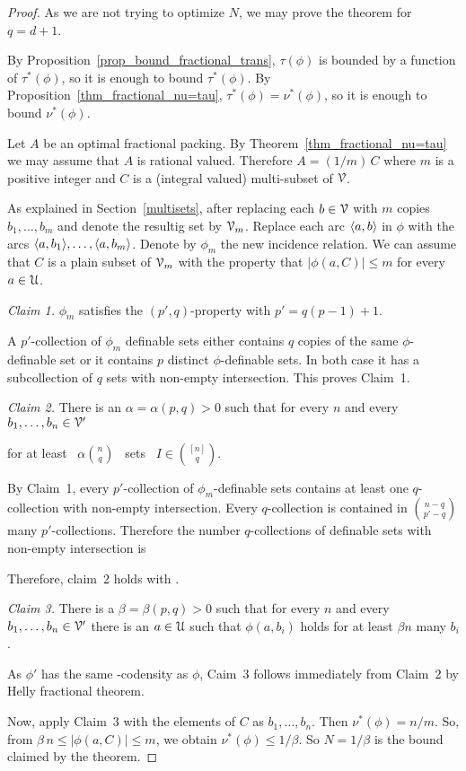 \documentclass[sputnik.tex]{subfiles}
\begin{document}
\begin{proof}
As we are not trying to optimize $N$, we may prove the theorem for $q=d+1$.

By Proposition~\ref{prop_bound_fractional_trans}, $\tau(\phi)$ is bounded by a function of $\tau^*(\phi)$, so it is enough to bound $\tau^*(\phi)$. By Proposition~\ref{thm_fractional_nu=tau},  $\tau^*(\phi)=\nu^*(\phi)$, so it is enough to bound $\nu^*(\phi)$.

Let $A$ be an optimal fractional packing. By Theorem~\ref{thm_fractional_nu=tau} we may assume that $A$ is rational valued. Therefore $A=(1/m)\,C$ where $m$ is a positive integer and $C$ is a (integral valued) multi-subset of $\EuScript V$. 

As explained in Section~\ref{multisets}, after replacing each $b\in\EuScript V$ with $m$ copies $b_1,\dots,b_m$ and denote the resultig set by $\EuScript V_m$.
Replace each arc $\langle a,b\rangle$ in $\phi$ with the arcs $\langle a,b_1\rangle,\dots,\langle a,b_m\rangle$.
Denote by $\phi_m$ the new incidence relation.
We can assume that $C$ is a plain subset of $\EuScript V_m$ with the property that $|\phi(a,C)|\le m$ for every $a\in\EuScript U$.

\smallskip
\textit{Claim 1.} $\phi_m$ satisfies the $(p',q)$-property with $p'=q(p-1)+1$.

A $p'$-collection of $\phi_m$ definable sets either contains $q$ copies of the same $\phi$-definable set or it contains $p$ distinct $\phi$-definable sets. In both case it has a subcollection of $q$ sets with non-empty intersection. This proves Claim~1.

\smallskip
\textit{Claim 2.}
There is an $\alpha=\alpha(p,q)>0$ such that for every $n$ and every $b_1,\dots,b_n\in\EuScript V'$

\hfill for at least \ $\displaystyle\alpha{n\choose q}$ \ sets \ $\displaystyle I\in{[n]\choose q}$.

By Claim~1, every $p'$-collection of $\phi_m$-definable sets contains at least one $q$-collection with non-empty intersection.
Every $q$-collection is contained in ${n-q\choose p'-q}$ many $p'$-collections.
Therefore the number $q$-collections of definable sets with non-empty intersection is


Therefore, claim~2 holds with .

\medskip
\textit{Claim 3.}
There is a $\beta=\beta(p,q)>0$ such that for every $n$ and every $b_1,\dots,b_n\in\EuScript V'$ there is an $a\in\EuScript U$ such that $\phi(a,b_i)$ holds for at least $\beta n$ many $b_i$.

As $\phi'$ has the same \vc-codensity as $\phi$,  Caim~3 follows immediately from Claim~2 by Helly fractional theorem.

Now, apply Claim~3 with the elements of $C$ as $b_1,\dots,b_n$. Then $\nu^*(\phi)=n/m$. So, from $\beta\,n\le |\phi(a,C)|\le m$, we obtain  $\nu^*(\phi)\le 1/\beta$. So $N=1/\beta$ is the bound claimed by the theorem.
\end{proof}
\end{document}
